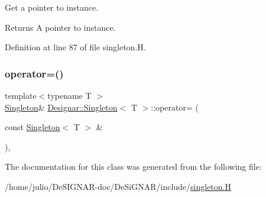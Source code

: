 Get a pointer to instance.

\begin{DoxyReturn}{Returns}
A pointer to instance. 
\end{DoxyReturn}


Definition at line 87 of file singleton.\+H.

\mbox{\label{class_designar_1_1_singleton_a8968c625d740c01211ec483142e52a58}} 
\subsubsection{\texorpdfstring{operator=()}{operator=()}}
{\footnotesize\ttfamily template$<$typename T $>$ \\
\hyperlink{class_designar_1_1_singleton}{Singleton}\& \hyperlink{class_designar_1_1_singleton}{Designar\+::\+Singleton}$<$ T $>$\+::operator= (\begin{DoxyParamCaption}\item[{const \hyperlink{class_designar_1_1_singleton}{Singleton}$<$ T $>$ \&}]{ }\end{DoxyParamCaption})\hspace{0.3cm}{\ttfamily [protected]}, {\ttfamily [delete]}}



The documentation for this class was generated from the following file\+:\begin{DoxyCompactItemize}
\item 
/home/julio/\+De\+S\+I\+G\+N\+A\+R-\/doc/\+De\+Si\+G\+N\+A\+R/include/\hyperlink{singleton_8_h}{singleton.\+H}\end{DoxyCompactItemize}
